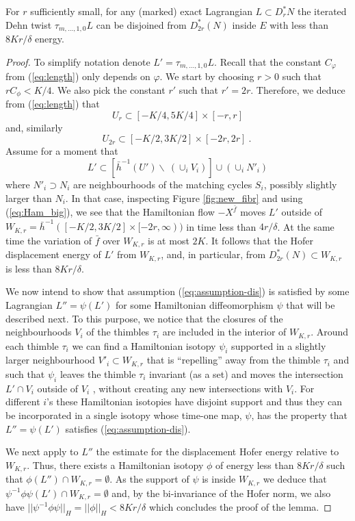 \begin{lem}\label{lem:disj-energy} For $r$ sufficiently small, for any (marked) exact Lagrangian $L\subset D^{\ast}_{r} N$ the iterated Dehn twist $\tau_{m, \ldots, 1,0}L$ can be disjoined from $D^{\ast}_{2r} (N)$ inside $E$ with less  than $8Kr/\delta$ energy. 
\end{lem}
\begin{proof} To simplify notation denote $L'= \tau_{m, \ldots, 1,0}L$. Recall
that the constant $C_{\varphi}$ from (\ref{eq:length}) only depends on $\varphi$. We start by choosing $r>0$ such that $rC_{\phi}<K/4$. We also pick the constant $r'$ such that $r'=2r$. Therefore,
we deduce from (\ref{eq:length}) that 
$$U_{r}\subset [-K/4, 5K/4]\times [-r,r]$$
and, similarly $$U_{2r}\subset [-K/2, 3K/2]\times [-2r,2r]~.~$$
Assume for a moment that 
\begin{equation}\label{eq:assumption-dis}
L' \subset [\bar{h}^{-1}(U') \backslash \ (\cup_{i} V_{i}) ] \cup (\cup_{i} N'_{i})
\end{equation}
where $N'_{i}\supset N_{i}$ are neighbourhoods of the matching cycles $S_{i}$, possibly slightly larger than $N_{i}$. In that case, inspecting Figure \ref{fig:new_fibr} and  using (\ref{eq:Ham_big}), we see that the Hamiltonian flow $- X^{\bar{f}}$ moves $L'$ outside of $W_{K,r}=\bar{h}^{-1}([-K/2, 3K/2]\times [-2r,\infty))$ in time 
less than $4r/\delta$. At the same time the variation of $\bar{f}$ over $W_{K,r}$ is at most $2K$. It follows  that the Hofer displacement energy
of $L'$ from $W_{K,r}$, and, in particular, from $D^{\ast}_{2r}(N)\subset W_{K,r}$ 
 is less than $8Kr/\delta$.

We now intend to show that assumption (\ref{eq:assumption-dis}) is satisfied by some Lagrangian $L''=\psi (L')$ for some Hamiltonian diffeomorphism $\psi$ that will be described next. To this purpose, we notice that the closures of the neighbourhoods $V_{i}$ of the thimbles $\tau_{i}$ are included in the interior of $W_{K,r}$. Around each thimble $\tau_{i}$ we can find a Hamiltonian isotopy $\psi_{i}$ supported in a slightly larger neighbourhood $V'_{i}\subset W_{K,r}$ that is ``repelling'' away from
the thimble $\tau_{i}$ and such that $\psi_{i}$ leaves the thimble $\tau_{i}$ invariant (as a set) and moves the intersection $L'\cap V_{i}$  outside of $V_{i}$ , without creating any new intersections with $V_{i}$. For different $i$'s these Hamiltonian isotopies have disjoint support and thus they can be incorporated in a single isotopy whose time-one map, $\psi$, has
the property that $L''=\psi (L')$ satisfies (\ref{eq:assumption-dis}). 

We next apply to $L''$ the estimate for the displacement Hofer energy relative to $W_{K,r}$. Thus, there exists a Hamiltonian isotopy $\phi$ of energy less than
$8Kr/\delta$ such that  $\phi (L'')\cap W_{K,r}=\emptyset$. As the support of
$\psi$ is inside $W_{K,r}$ we deduce that $\psi^{-1}\phi\psi (L') \cap W_{K,r}=\emptyset$ and, by the bi-invariance of the Hofer norm, we also have $||\psi^{-1}\phi\psi||_{H}=||\phi||_{H}< 8Kr/\delta$ which concludes the proof of the lemma.

\end{proof}


